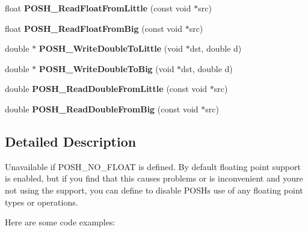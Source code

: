 \begin{DoxyCompactItemize}
\item 
float {\bfseries P\+O\+S\+H\+\_\+\+Read\+Float\+From\+Little} (const void $\ast$src)\hypertarget{group__FloatingPoint_ga8a5230cf014861ad246bb487eba4eb55}{}\label{group__FloatingPoint_ga8a5230cf014861ad246bb487eba4eb55}

\item 
float {\bfseries P\+O\+S\+H\+\_\+\+Read\+Float\+From\+Big} (const void $\ast$src)\hypertarget{group__FloatingPoint_gab579133168ae4d67e4744d9d8ee792f7}{}\label{group__FloatingPoint_gab579133168ae4d67e4744d9d8ee792f7}

\item 
double $\ast$ {\bfseries P\+O\+S\+H\+\_\+\+Write\+Double\+To\+Little} (void $\ast$dst, double d)\hypertarget{group__FloatingPoint_ga5ee8b046be0741616aecc88607718b4b}{}\label{group__FloatingPoint_ga5ee8b046be0741616aecc88607718b4b}

\item 
double $\ast$ {\bfseries P\+O\+S\+H\+\_\+\+Write\+Double\+To\+Big} (void $\ast$dst, double d)\hypertarget{group__FloatingPoint_gaaeef5c2c79df383ba15e374d9a04751f}{}\label{group__FloatingPoint_gaaeef5c2c79df383ba15e374d9a04751f}

\item 
double {\bfseries P\+O\+S\+H\+\_\+\+Read\+Double\+From\+Little} (const void $\ast$src)\hypertarget{group__FloatingPoint_ga2a7d15d132374bbe73f76b74ebaf7204}{}\label{group__FloatingPoint_ga2a7d15d132374bbe73f76b74ebaf7204}

\item 
double {\bfseries P\+O\+S\+H\+\_\+\+Read\+Double\+From\+Big} (const void $\ast$src)\hypertarget{group__FloatingPoint_gab546851bb96225711dee8fe819a2f806}{}\label{group__FloatingPoint_gab546851bb96225711dee8fe819a2f806}

\end{DoxyCompactItemize}


\subsection{Detailed Description}
Unavailable if P\+O\+S\+H\+\_\+\+N\+O\+\_\+\+F\+L\+O\+AT is defined. By default floating point support is enabled, but if you find that this causes problems or is inconvenient and you\textquotesingle{}re not using the support, you can define { to disable P\+O\+SH\textquotesingle{}s use of any floating point types or operations.}

{\ttfamily  Here are some code examples\+:}

